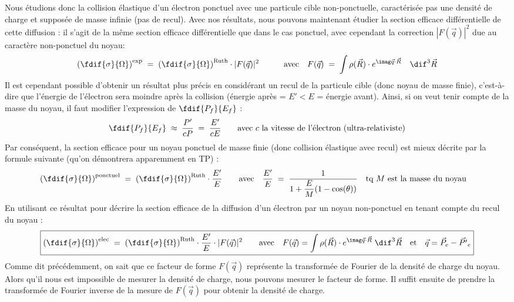 Nous étudions donc la collision élastique d'un électron ponctuel avec une particule cible non-ponctuelle, caractérisée pas une densité de charge et supposée de masse infinie (pas de recul). Avec nos résultats, nous pouvons maintenant étudier la section efficace différentielle de cette diffusion : il s'agit de la même section efficace différentielle que dans le cas ponctuel, avec cependant la correction $|F(\vec{q})|^2$ due au caractère non-ponctuel du noyau:
\[
    \left( \fdif{\sigma}{\Omega} \right)^\text{exp}
    \eq
    \left( \fdif{\sigma}{\Omega} \right)^\text{Ruth}
    \cdot |F(\vec{q})|^2
    \qquad \quad \text{avec} \quad
    F(\vec{q}) \eq \int 
    \rho(\vec{R}) \cdot e^{\imag\vec{q} \cdot\vec{R}}
    \quad \dif^3\vec{R}
\]
Il est cependant possible d'obtenir un résultat plus précis en considérant un recul de la particule cible (donc noyau de masse finie), c'est-à-dire que l'énergie de l'électron sera moindre après la collision (énergie après = $E'<E$ = énergie avant). Ainsi, si on veut tenir compte de la masse du noyau, il faut modifier l'expression de $\fdif{P_f}{E_f}$ :
\[
    \fdif{P_f}{E_f} \;\approx\; \dfrac{P'}{cP} \eq \dfrac{E'}{cE}
    \qquad \text{avec $c$ la vitesse de l'électron (ultra-relativiste)}
\]
Par conséquent, la section efficace pour un noyau ponctuel de masse finie (donc collision élastique avec recul) est mieux décrite par la formule suivante (qu'on démontrera apparemment en TP) :
\[
    \left( \fdif{\sigma}{\Omega} \right)^\text{ponctuel}
    \eq
    \left( \fdif{\sigma}{\Omega} \right)^\text{Ruth}
    \cdot \dfrac{E'}{E}
    \qquad \text{avec} \quad
    \dfrac{E'}{E} \eq
    \dfrac{1}{1+\dfrac{E}{M}(1-\cos(\theta))} 
    \quad \text{tq $M$ est la masse du noyau} \quad 
\]
En utilisant ce résultat pour décrire la section efficace de la diffusion d'un électron par un noyau non-ponctuel en tenant compte du recul du noyau :
\[
\boxed{
    \left( \fdif{\sigma}{\Omega} \right)^\text{elec}
    \eq
    \left( \fdif{\sigma}{\Omega} \right)^\text{Ruth}
    \cdot \dfrac{E'}{E}
    \cdot |F(\vec{q})|^2
    \qquad \text{avec} \quad 
     F(\vec{q}) = \int 
    \rho(\vec{R}) \cdot e^{\imag\vec{q} \cdot\vec{R}}
    \; \dif^3\vec{R}
    \quad \text{et} \quad
    \vec{q} = \vec{P}_e - \vec{P'}_e
}
\]
Comme dit précédemment, on sait que ce facteur de forme $F(\vec{q})$ représente la transformée de Fourier de la densité de charge du noyau. Alors qu'il nous est impossible de mesurer la densité de charge, nous pouvons mesurer le facteur de forme. Il suffit ensuite de prendre la transformée de Fourier inverse de la mesure de $F(\vec{q})$ pour obtenir la densité de charge.\\
